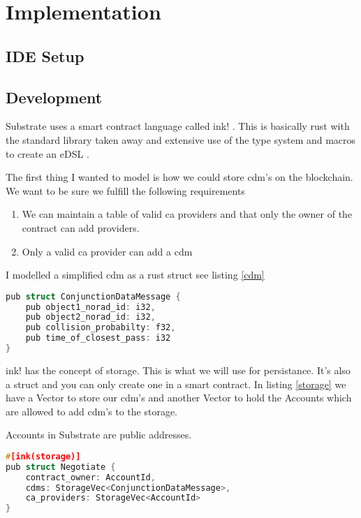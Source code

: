 \chapter{Implementation}

\section{IDE Setup}

\section{Development}

Substrate uses a smart contract language called ink! \cite{ink}. This is basically rust with the standard
library taken away and extensive use of the type system and macros to create an eDSL \cite{edsl}.

The first thing I wanted to model is how we could store \gls{cdm}'s on the blockchain.
We want to be sure we fulfill the following requirements

\begin{enumerate}
    \item We can maintain a table of valid \acrshort{ca} providers and that only the owner of the contract can add 
        providers.
    \item Only a valid \acrshort{ca} provider can add a \gls{cdm}
\end{enumerate}

I modelled a simplified \gls{cdm} as a rust struct see listing \ref{cdm}

\begin{lstlisting}[label={cdm},language=c,caption={CDM Struct}]
pub struct ConjunctionDataMessage {
    pub object1_norad_id: i32,
    pub object2_norad_id: i32,
    pub collision_probabilty: f32,
    pub time_of_closest_pass: i32
}
\end{lstlisting}

ink! \cite{ink} has the concept of storage. This is what we will use for persistance. It's also a struct and you can only create one
in a smart contract. In listing \ref{storage} we have a Vector to store our \gls{cdm}'s and another Vector
to hold the Accounts which are allowed to add \gls{cdm}'s to the storage.


Accounts in Substrate are public addresses. 

\begin{lstlisting}[label={storage},language=c,caption={ink! storage}]
#[ink(storage)]
pub struct Negotiate {
    contract_owner: AccountId,
    cdms: StorageVec<ConjunctionDataMessage>,
    ca_providers: StorageVec<AccountId>
}
\end{lstlisting}

